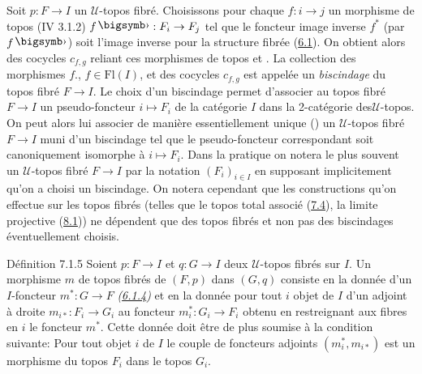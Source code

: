\documentclass[10pt]{../fichiers-configuration-latex/smfart}
\begin{document}
\subsubsection{}

Soit $p : F \to I$ un $𝒰$-topos fibré. Choisissons pour
chaque $f : i \to j$ un morphisme de topos (IV 3.1.2) $f\bigdot :
F_i \to F_j$ tel que le foncteur image inverse $f^{\ast}$ (par
$f\bigdot$) soit l'image inverse pour la structure fibrée
(\hyperref[VI.def6.1]{6.1}). On obtient alors des cocycles $c_{f, g}$ reliant
ces morphismes de  topos  et . La
collection des morphismes $f.$, $f \in \text{Fl}(I)$, et des
cocycles $c_{f, g}$ est appelée un \emph{biscindage} du topos fibré
$F \to I$. Le choix d'un biscindage permet d'associer au topos fibré
$F \to I$ un pseudo-foncteur $i \mapsto F_i$ de la catégorie $I$
dans la 2-catégorie des\pageoriginale $𝒰$-topos. On peut
alors lui associer de manière essentiellement unique (\cf \cite{SGA4-06:5})
un $𝒰$-topos fibré $F \to I$ muni d'un biscindage tel que le
pseudo-foncteur correspondant soit canoniquement isomorphe à $i
\mapsto F_i$. Dans la pratique on notera le plus souvent un
$𝒰$-topos fibré $F \to I$ par la notation $(F_i)_{i \in I}$
en supposant implicitement qu'on a choisi un biscindage. On notera
cependant que les constructions qu'on effectue sur les topos fibrés
(telles que le topos total associé (\hyperref[VI.subsec7.4]{7.4}), la limite
projective (\hyperref[VI.subsec8.1]{8.1})) ne dépendent que des topos fibrés
et non pas des biscindages éventuellement choisis.

\begin{enonce*}{Définition 7.1.5}
Soient $p : F \to I$ et $q : G \to I$ deux $𝒰$-topos fibrés sur
$I$. Un morphisme $m$ de topos fibrés de $(F, p)$ dans $(G, q)$
consiste en la donnée d'un $I$-foncteur $m^{\ast} : G \to F$ \emph{(\hyperref[VI.subsubsec6.1.4]{6.1.4})}
et en la donnée pour tout $i$ objet de $I$ d'un adjoint à droite
$m_{i\ast} : F_i \to G_i$ au foncteur $m^{\ast}_i : G_i \to F_i$
obtenu en restreignant aux fibres en $i$ le foncteur $m^{\ast}$. Cette
donnée doit être de plus soumise à la condition suivante: Pour tout
objet $i$ de $I$ le couple de foncteurs adjoints $(m^{\ast}_i,
m_{i\ast})$ est un morphisme du topos $F_i$ dans le topos $G_i$.
\end{enonce*}

\setcounter{subsubsection}{5}
\subsubsection{}
\end{document}
